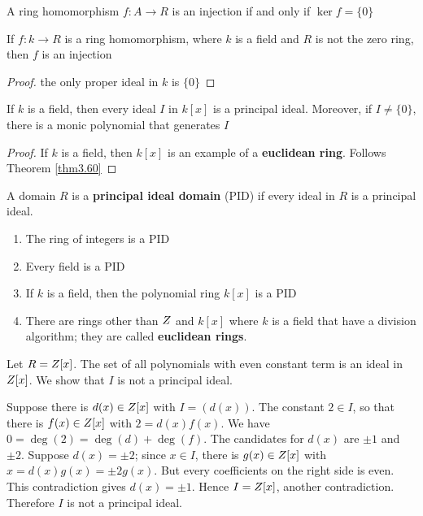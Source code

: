 \documentclass[11pt]{article}
\begin{document}
\begin{proposition}[]
A ring homomorphism \(f:A \to R\) is an injection if and only if \(\ker f=\{0\}\)
\end{proposition}

\begin{corollary}[]
If \(f:k\to R\) is a ring homomorphism, where \(k\) is a field and \(R\) is not the
zero ring, then \(f\) is an injection
\end{corollary}

\begin{proof}
the only proper ideal in \(k\) is \(\{0\}\)
\end{proof}

\begin{theorem}[]
\label{thm3.54}
If \(k\) is a field, then every ideal \(I\) in \(k[x]\) is a principal ideal.
Moreover, if \(I\neq\{0\}\), there is a monic polynomial that generates \(I\)
\end{theorem}

\begin{proof}
If \(k\) is a field, then \(k[x]\) is an example of a \textbf{euclidean ring}. Follows
Theorem \ref{thm3.60}
\end{proof}


\begin{definition}[]
A domain \(R\) is a \textbf{principal ideal domain} (PID) if every ideal in \(R\) is a principal
ideal. 
\end{definition}

\begin{examplle}[]
\begin{enumerate}
\item The ring of integers is a PID
\item Every field is a PID
\item If \(k\) is a field, then the polynomial ring \(k[x]\) is a PID
\item There are rings other than \(\relax{Z}\) and \(k[x]\) where \(k\) is a field that
have a division algorithm; they are called \textbf{euclidean rings}.
\end{enumerate}
\end{examplle}

\begin{examplle}[]
Let \(R=\relax{Z}[x]\). The set of all polynomials with even constant term is an
ideal in \(\relax{Z}[x]\). We show that \(I\) is not a principal ideal.

Suppose there is \(d(x)\in\relax{Z}[x]\) with \(I=(d(x))\). The constant \(2\in I\),
so that there is \(f(x)\in\relax{Z}[x]\) with \(2=d(x)f(x)\). We have
\(0=\deg(2)=\deg(d)+\deg(f)\). The candidates for \(d(x)\) are \(\pm1\) and
\(\pm2\). Suppose \(d(x)=\pm2\); since \(x\in I\), there is \(g(x)\in\relax{Z}[x]\) with
\(x=d(x)g(x)=\pm2g(x)\). But every coefficients on the right side is even.
This contradiction gives \(d(x)=\pm1\). Hence \(I=\relax{Z}[x]\), another
contradiction. Therefore \(I\) is not a principal ideal.
\end{examplle}
\end{document}
